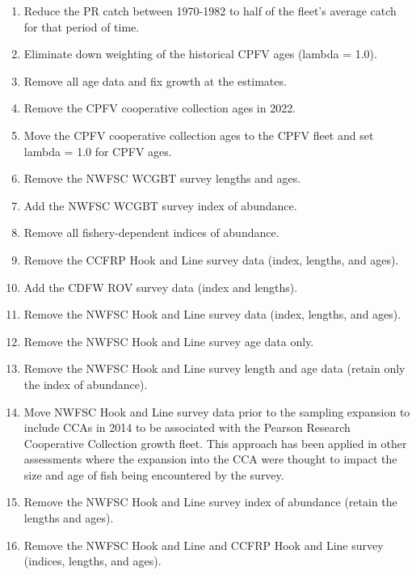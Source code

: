 \documentclass[11pt,
  english,
  letterpaper,
]{article}
\begin{document}
\begin{enumerate}
   
  \item Reduce the PR catch between 1970-1982 to half of the fleet's average catch for that period of time.
  
  \item Eliminate down weighting of the historical CPFV ages (lambda = 1.0).
  
  \item Remove all age data and fix growth at the estimates.
  
  \item Remove the CPFV cooperative collection ages in 2022.
  
  \item Move the CPFV cooperative collection ages to the CPFV fleet and set lambda = 1.0 for CPFV ages.
  
  \item Remove the NWFSC WCGBT survey lengths and ages.
  
  \item Add the NWFSC WCGBT survey index of abundance.
  
  \item Remove all fishery-dependent indices of abundance.
  
  \item Remove the CCFRP Hook and Line survey data (index, lengths, and ages).
  
  \item Add the CDFW ROV survey data (index and lengths).
  
  \item Remove the NWFSC Hook and Line survey data (index, lengths, and ages).
  
  \item Remove the NWFSC Hook and Line survey age data only.
  
  \item Remove the NWFSC Hook and Line survey length and age data (retain only the index of abundance).
  
  \item Move NWFSC Hook and Line survey data prior to the sampling expansion to include CCAs in 2014 to be associated with the Pearson Research Cooperative Collection growth fleet. This approach has been applied in other assessments where the expansion into the CCA were thought to impact the size and age of fish being encountered by the survey. 
  
  \item Remove the NWFSC Hook and Line survey index of abundance (retain the lengths and ages).
  
  \item Remove the NWFSC Hook and Line and CCFRP Hook and Line survey (indices, lengths, and ages).

\end{enumerate}
\end{document}
